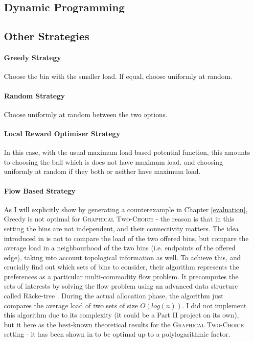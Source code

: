 \subsection{Dynamic Programming}


\subsection{Other Strategies}


\paragraph{Greedy Strategy} Choose the bin with the smaller load. If equal, choose uniformly at random.


\paragraph{Random Strategy} Choose uniformly at random between the two options.



\paragraph{Local Reward Optimiser Strategy} In this case, with the usual maximum load based potential function, this amounts to choosing the ball which is does not have maximum load, and choosing uniformly at random if they both or neither have maximum load.


\paragraph{Flow Based Strategy}

As I will explicitly show by generating a counterexample in Chapter \ref{evaluation}, Greedy is not optimal for \textsc{Graphical Two-Choice} - the reason is that in this setting the bins are not independent, and their connectivity matters. The idea introduced in \cite{bansal2021twochoicegraphical} is not to compare the load of the two offered bins, but compare the average load in a neighbourhood of the two bins (i.e. endpoints of the offered edge), taking into account topological information as well. To achieve this, and crucially find out which sets of bins to consider, their algorithm represents the preferences as a particular multi-commodity flow problem. It precomputes the sets of interests by solving the flow problem using an advanced data structure called R\"{a}cke-tree \cite{racke2008racketree}. During the actual allocation phase, the algorithm just compares the average load of two sets of size $O(log(n))$. I did not implement this algorithm due to its complexity (it could be a Part II project on its own), but it here as the best-known theoretical results for the \textsc{Graphical Two-Choice} setting - it has been shown in \cite{bansal2021twochoicegraphical} to be optimal up to a polylogarithmic factor.


